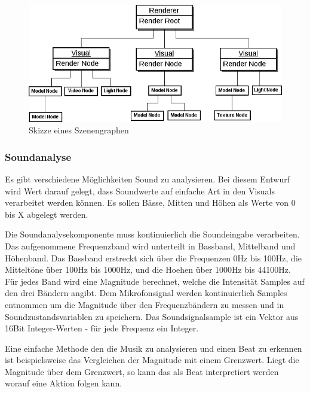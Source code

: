 \begin{figure}[h!]
    \centering
    \includegraphics[width=1\textwidth]{pictures/data_structure1.png}
    \caption{Skizze eines Szenengraphen}
\end{figure}


\subsubsection{Soundanalyse}

Es gibt verschiedene M\"oglichkeiten Sound zu analysieren. Bei diesem Entwurf wird Wert darauf gelegt, dass
Soundwerte auf einfache Art in den Visuals verarbeitet werden k\"onnen. Es sollen B\"asse, Mitten und H\"ohen
als Werte von  0 bis X abgelegt werden.

Die Soundanalysekomponente muss kontinuierlich die Soundeingabe verarbeiten. Das aufgenommene Frequenzband
wird unterteilt in Bassband, Mittelband und H\"ohenband.
Das Bassband erstreckt sich \"uber die Frequenzen 0Hz bis 100Hz, die Mittelt\"one \"uber 100Hz bis 1000Hz,
und die Hoehen \"uber 1000Hz bis 44100Hz.
F\"ur jedes Band wird eine Magnitude berechnet, welche die Intensit\"at Samples auf den drei B\"andern angibt.
Dem Mikrofonsignal werden kontinuierlich Samples entnommen um die Magnitude \"uber den Frequenzb\"andern zu
messen und in Soundzustandsvariablen zu speichern. Das Soundsignalsample ist ein Vektor aus 16Bit Integer-Werten -
f\"ur jede Frequenz ein Integer.

Eine einfache Methode den die Musik zu analysieren und einen Beat zu erkennen ist beispielsweise das Vergleichen
der Magnitude mit einem Grenzwert. Liegt die Magnitude \"uber dem Grenzwert, so kann das als Beat interpretiert
werden worauf eine Aktion folgen kann.


